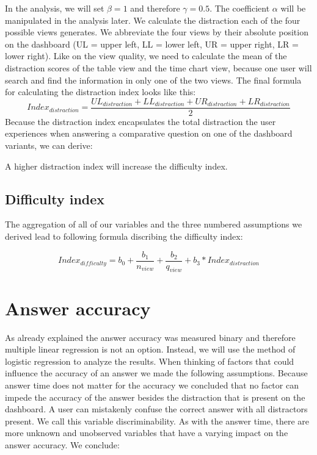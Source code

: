 In the analysis, we will set $\beta = 1$ and therefore $\gamma = 0.5$. The coefficient $\alpha$ will be manipulated in the analysis later. 
We calculate the distraction each of the four possible views generates. We abbreviate the four views by their absolute position on the dashboard
(UL = upper left, LL = lower left, UR = upper right, LR = lower right). Like on the view quality, we need to calculate the mean of the distraction scores
of the table view and the time chart view, because one user will search and find the information in only one of the two views. The final formula for
calculating the distraction index looks like this:
\begin{equation} \label{distractionIndexEquation}
    Index_{distraction} = \frac{UL_{distraction} + LL_{distraction} + UR_{distraction} + LR_{distraction}}{2}
\end{equation} 
Because the distraction index encapsulates the total distraction the user experiences when answering a comparative question on one of the dashboard variants,
we can derive:
\begin{statements}[resume]
    \item A higher distraction index will increase the difficulty index.
\end{statements}

\subsection{Difficulty index}

The aggregation of all of our variables and the three numbered assumptions we derived lead to following formula discribing the difficulty index:

\begin{equation} \label{difficultyIndexEquation}
    Index_{difficulty} = b_0 + \frac{b_1}{n_{view}} + \frac{b_2}{q_{view}} + b_3 * Index_{distraction}
\end{equation}


\section{Answer accuracy}
As already explained the answer accuracy was measured binary and therefore multiple linear regression is not an option. Instead, we will use the
method of logistic regression to analyze the results. When thinking of factors that could influence the accuracy of an answer we made the
following assumptions. Because answer time does not matter for the accuracy we concluded that no factor can impede the accuracy of the answer besides the
distraction that is present on the dashboard. A user can mistakenly confuse the correct answer with all distractors present. We call this variable 
discriminability. As with the answer time, there are more unknown and unobserved variables that have a varying impact on the answer accuracy.
We conclude:

